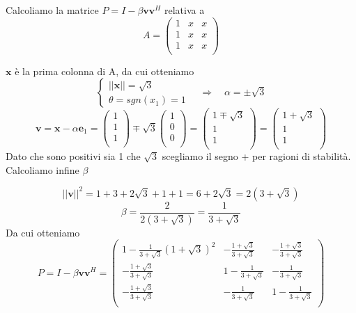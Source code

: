 \begin{example}[Calcolo di P]
Calcoliamo la matrice $P = I - \beta \mathbf{v}\mathbf{v}^{H}$ relativa a
  $$ A =
  \begin{pmatrix}
    1 & x & x\\
    1 & x & x\\
    1 & x & x\\
  \end{pmatrix} $$

$\mathbf{x}$ \`e la prima colonna di A, da cui otteniamo
\[ \left\{
  \begin{array}{ll}
 || \mathbf{x} || = \sqrt{3} \\ 
 \theta = sgn(x_1) = 1
\end{array} \right.
\quad \Longrightarrow \quad \alpha = \pm  \sqrt{3}
\]
$$ \mathbf{v} = \mathbf{x} - \alpha \mathbf{e}_1 = 
\begin{pmatrix}
1 \\
1 \\
1 \\
\end{pmatrix}
\mp
\sqrt{3}
\begin{pmatrix}
1 \\
0 \\
0 \\
\end{pmatrix}
= 
\begin{pmatrix}
1 \mp \sqrt{3} \\
1 \\
1 \\
\end{pmatrix}
=
\begin{pmatrix}
1 + \sqrt{3} \\
1 \\
1 \\
\end{pmatrix}
$$
Dato che sono positivi sia 1 che $\sqrt{3}$ scegliamo il segno + per
ragioni di stabilit\`a. Calcoliamo infine $\beta$

$$ || \mathbf{v} ||^{2} = 1 + 3 + 2\sqrt{3} + 1 + 1 = 6 + 2\sqrt{3} = 2(3+\sqrt{3})$$
$$ \beta = \frac{2}{2(3+\sqrt{3})} = \frac{1}{3+ \sqrt{3}}$$
Da cui otteniamo 
$$P = I - \beta \mathbf{v}\mathbf{v}^{H} = 
\begin{pmatrix}
  1 - \frac{1}{3+\sqrt{3}}(1+\sqrt{3})^{2} 	& -\frac{1+\sqrt{3}}{3+\sqrt{3}} & -\frac{1+\sqrt{3}}{3+\sqrt{3}}   \\
  -\frac{1+\sqrt{3}}{3+\sqrt{3}}			& 1 - \frac{1}{3+\sqrt{3}} 	& -\frac{1}{3+\sqrt{3}}   \\
  -\frac{1+\sqrt{3}}{3+\sqrt{3}}            &  -\frac{1}{3+\sqrt{3}}  & 1 - \frac{1}{3+\sqrt{3}} \\
\end{pmatrix}
$$
\end{example}

